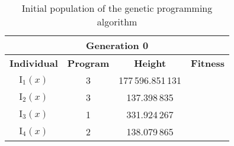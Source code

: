 \begin{table}[ht!]
  \centering
  \begin{tabular}{c|c|c|r}
    \multicolumn{4}{c}{\textbf{Generation 0}}	\\
    \hline
    \hline
    \textbf{Individual} & \textbf{Program} & \textbf{Height} & \textbf{Fitness}	\\
    \hline
    $\mathrm{I}_1(x)$ & 3 & 177\,596.851\,131	\\
    $\mathrm{I}_2(x)$ & 3 & 137.398\,835	\\
    $\mathrm{I}_3(x)$ & 1 & 331.924\,267	\\
    $\mathrm{I}_4(x)$ & 2 & 138.079\,865	\\
  \end{tabular}
  \caption{Initial population of the genetic programming algorithm}
  \label{tab:bg:gp:sym:init:pop}
\end{table}
